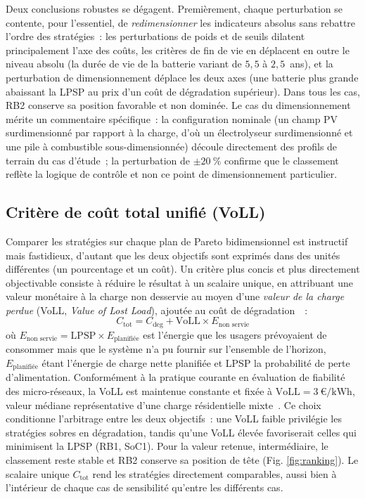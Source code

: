 Deux conclusions robustes se dégagent. Premièrement, chaque perturbation se contente, pour l'essentiel, de \emph{redimensionner} les indicateurs absolus sans rebattre l'ordre des stratégies~: les perturbations de poids et de seuils dilatent principalement l'axe des coûts, les critères de fin de vie en déplacent en outre le niveau absolu (la durée de vie de la batterie variant de $5{,}5$ à $2{,}5$~ans), et la perturbation de dimensionnement déplace les deux axes (une batterie plus grande abaissant la LPSP au prix d'un coût de dégradation supérieur). Dans tous les cas, RB2 conserve sa position favorable et non dominée. Le cas du dimensionnement mérite un commentaire spécifique~: la configuration nominale (un champ PV surdimensionné par rapport à la charge, d'où un électrolyseur surdimensionné et une pile à combustible sous-dimensionnée) découle directement des profils de terrain du cas d'étude~; la perturbation de $\pm\SI{20}{\percent}$ confirme que le classement reflète la logique de contrôle et non ce point de dimensionnement particulier.

\subsection{Critère de coût total unifié (VoLL)}

Comparer les stratégies sur chaque plan de Pareto bidimensionnel est instructif mais fastidieux, d'autant que les deux objectifs sont exprimés dans des unités différentes (un pourcentage et un coût). Un critère plus concis et plus directement objectivable consiste à réduire le résultat à un scalaire unique, en attribuant une valeur monétaire à la charge non desservie au moyen d'une \emph{valeur de la charge perdue} (VoLL, \textit{Value of Lost Load}), ajoutée au coût de dégradation~\cite{keskinis_techno-economic_2025}~:
\begin{equation}
    C_{\text{tot}} = C_{\text{deg}} + \mathrm{VoLL} \times E_{\text{non servie}}
    \label{eq:total_cost}
\end{equation}
où $E_{\text{non servie}} = \mathrm{LPSP} \times E_{\text{planifiée}}$ est l'énergie que les usagers prévoyaient de consommer mais que le système n'a pu fournir sur l'ensemble de l'horizon, $E_{\text{planifiée}}$ étant l'énergie de charge nette planifiée et LPSP la probabilité de perte d'alimentation. Conformément à la pratique courante en évaluation de fiabilité des micro-réseaux, la VoLL est maintenue constante et fixée à $\mathrm{VoLL} = 3~\text{€/kWh}$, valeur médiane représentative d'une charge résidentielle mixte~\cite{CEPA2018VoLL}\cite{jin_evaluating_2025}. Ce choix conditionne l'arbitrage entre les deux objectifs~: une VoLL faible privilégie les stratégies sobres en dégradation, tandis qu'une VoLL élevée favoriserait celles qui minimisent la LPSP (RB1, SoC1). Pour la valeur retenue, intermédiaire, le classement reste stable et RB2 conserve sa position de tête (Fig. \ref{fig:ranking}). Le scalaire unique $C_{\text{tot}}$ rend les stratégies directement comparables, aussi bien à l'intérieur de chaque cas de sensibilité qu'entre les différents cas.

